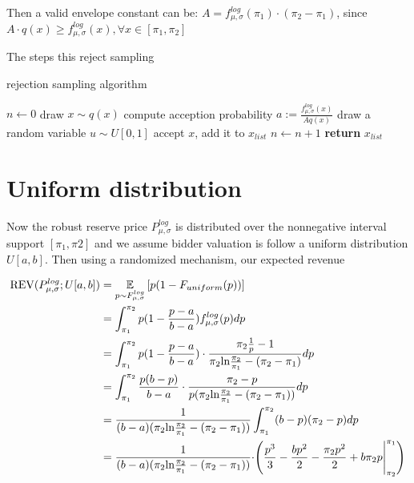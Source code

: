 Then a valid envelope constant can be: $A = f^{log}_{\mu,\sigma} (\pi_1)\cdot (\pi_2 - \pi_1)$, since $A \cdot q(x) \geqslant	f^{log}_{\mu,\sigma} (x) , 	\forall x \in [\pi_1,\pi_2]$

The steps this reject sampling

\begin{algorithm}
	\caption{rejection sampling algorithm}\label{alg:boundRejection}
	\begin{algorithmic}[1]
		\State $n \gets 0$
			\State draw $x \sim q(x)$		
			\State compute acception probability $a := \frac{f^{log}_{\mu,\sigma} (x) }{Aq(x)}$
			\State draw a random variable $u \sim U[0,1]$
				\State accept $x$, add it to $x_{list}$
				\State $n\gets n+1$	
			\EndIf
		\EndWhile
		\State \textbf{return} $x_{list}$
		\EndProcedure
	\end{algorithmic}
\end{algorithm}

\section{Uniform distribution}
Now the robust reserve price $P^{log}_{\mu,\sigma}$ is distributed over the nonnegative interval support $[\pi_1,\pi2]$ and we assume bidder valuation is follow a uniform distribution $U[a,b]$. Then using a randomized mechanism, our expected revenue 


\begin{equation}\notag
\begin{split}	
	\text{REV}(P^{log}_{\mu,\sigma} ;U[a,b]) &=\underset{p \sim F^{log}_{\mu,\sigma} }{\mathbb{E}}\left[ p(1-F_{uniform}(p))\right] \\ &= \int_{\pi_1}^{\pi_2} p(1 -  \frac{p-a}{b-a})f^{log}_{\mu,\sigma}(p)dp\\ &=\int_{\pi_1}^{\pi_2} p(1 -  \frac{p-a}{b-a}) \cdot \frac{\pi_2\frac{1}{p} -1}{\pi_2 \text{ln}\frac{\pi_2}{\pi_1} - (\pi_2-\pi_1)} dp \\&=\int_{\pi_1}^{\pi_2} \frac{p(b-p)}{b-a} \cdot \frac{\pi_2 -p}{p(\pi_2 \text{ln}\frac{\pi_2}{\pi_1} - (\pi_2-\pi_1))} dp \\&=  \frac{1}{(b-a)(\pi_2 \text{ln}\frac{\pi_2}{\pi_1} - (\pi_2-\pi_1))}\int_{\pi_1}^{\pi_2} (b-p)(\pi_2-p)dp\\&=  \frac{1}{(b-a)(\pi_2 \text{ln}\frac{\pi_2}{\pi_1} - (\pi_2-\pi_1))} \cdot \Biggr( \frac{p^3}{3} -\frac{bp^2}{2} -\frac{\pi_2p^2}{2} + b\pi_2 p \Biggr|_{\pi_2}^{\pi_1} \Biggr)              
\end{split}
\end{equation} 

